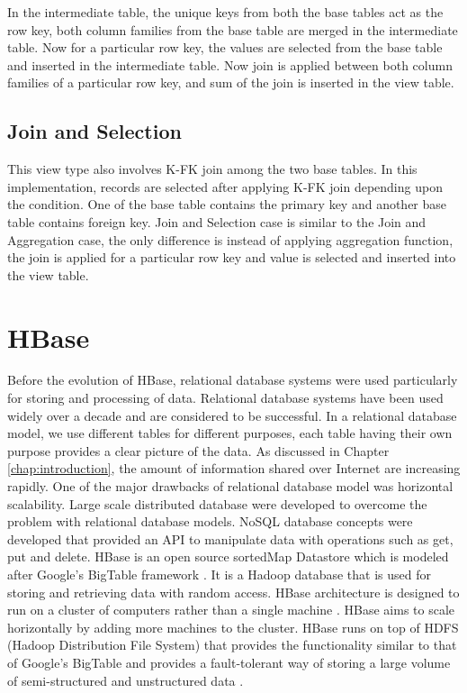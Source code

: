 \documentclass[11pt,a4paper,bibtotoc,idxtotoc,headsepline,footsepline,footexclude,BCOR12mm,DIV13]{scrbook}
\begin{document}
In the intermediate table, the unique keys from both the base tables act as the row key, both column families from the base table are merged in the intermediate table. Now for a particular row key, the values are selected from the base table and inserted in the intermediate table. Now join is applied between both column families of a particular row key, and sum of the join is inserted in the view table.  


\subsection{Join and Selection}
This view type also involves K-FK join among the two base tables. In this implementation, records are selected after applying K-FK join depending upon the condition. One of the base table contains the primary key and another base table contains foreign key. Join and Selection case is similar to the Join and Aggregation case, the only difference is instead of applying aggregation function, the join is applied for a particular row key and value is selected and inserted into the view table. 

\newpage
\section{HBase}
\label{sec:hbase}

Before the evolution of HBase, relational database systems were used particularly for storing and processing of data. Relational database systems have been used widely over a decade and are considered to be successful. In a relational database model, we use different tables for different purposes, each table having their own purpose provides  
a clear picture of the data. As discussed in Chapter \ref{chap:introduction}, the amount of information shared over Internet are increasing rapidly. One of the major drawbacks of relational database model was horizontal scalability. Large scale distributed database were developed to overcome the problem with relational database models. NoSQL database concepts were developed that provided an API to manipulate data with operations such as get, put and delete. HBase is an open source sortedMap Datastore which is modeled after Google's BigTable framework \cite{chang:bigtable}. It is a Hadoop database that is used for storing and retrieving data with random access. HBase architecture is designed to run on a cluster of computers rather than a single machine \cite{coprocessor:detail}. HBase aims to scale horizontally by adding more machines to the cluster. HBase runs on top of HDFS (Hadoop Distribution File System) that provides the functionality similar to that of Google's BigTable and provides a fault-tolerant way of storing a large volume of semi-structured and unstructured data \cite{bigdata:analysis}.
\end{document}
